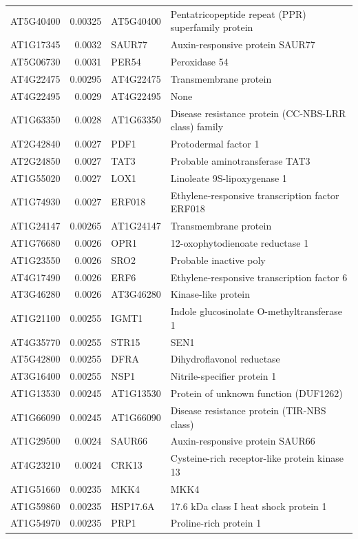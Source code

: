 \documentclass[11pt]{article}
\begin{document}
\begin{center}
\begin{tabular}{lrll}
AT5G40400 & 0.00325 & AT5G40400 & Pentatricopeptide repeat (PPR) superfamily protein\\
AT1G17345 & 0.0032 & SAUR77 & Auxin-responsive protein SAUR77\\
AT5G06730 & 0.0031 & PER54 & Peroxidase 54\\
AT4G22475 & 0.00295 & AT4G22475 & Transmembrane protein\\
AT4G22495 & 0.0029 & AT4G22495 & None\\
AT1G63350 & 0.0028 & AT1G63350 & Disease resistance protein (CC-NBS-LRR class) family\\
AT2G42840 & 0.0027 & PDF1 & Protodermal factor 1\\
AT2G24850 & 0.0027 & TAT3 & Probable aminotransferase TAT3\\
AT1G55020 & 0.0027 & LOX1 & Linoleate 9S-lipoxygenase 1\\
AT1G74930 & 0.0027 & ERF018 & Ethylene-responsive transcription factor ERF018\\
AT1G24147 & 0.00265 & AT1G24147 & Transmembrane protein\\
AT1G76680 & 0.0026 & OPR1 & 12-oxophytodienoate reductase 1\\
AT1G23550 & 0.0026 & SRO2 & Probable inactive poly\\
AT4G17490 & 0.0026 & ERF6 & Ethylene-responsive transcription factor 6\\
AT3G46280 & 0.0026 & AT3G46280 & Kinase-like protein\\
AT1G21100 & 0.00255 & IGMT1 & Indole glucosinolate O-methyltransferase 1\\
AT4G35770 & 0.00255 & STR15 & SEN1\\
AT5G42800 & 0.00255 & DFRA & Dihydroflavonol reductase\\
AT3G16400 & 0.00255 & NSP1 & Nitrile-specifier protein 1\\
AT1G13530 & 0.00245 & AT1G13530 & Protein of unknown function (DUF1262)\\
AT1G66090 & 0.00245 & AT1G66090 & Disease resistance protein (TIR-NBS class)\\
AT1G29500 & 0.0024 & SAUR66 & Auxin-responsive protein SAUR66\\
AT4G23210 & 0.0024 & CRK13 & Cysteine-rich receptor-like protein kinase 13\\
AT1G51660 & 0.00235 & MKK4 & MKK4\\
AT1G59860 & 0.00235 & HSP17.6A & 17.6 kDa class I heat shock protein 1\\
AT1G54970 & 0.00235 & PRP1 & Proline-rich protein 1\\

\end{tabular}
\end{center}
\end{document}
